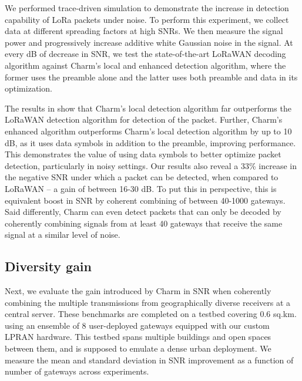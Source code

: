 We performed trace-driven simulation to demonstrate the increase in detection
capability of LoRa packets under noise. To perform this experiment, we collect
data at different spreading factors at high SNRs. We then measure the signal
power and progressively increase additive white Gaussian noise in the signal.
At every dB of decrease in SNR, we test the state-of-the-art LoRaWAN decoding
algorithm against Charm's local and enhanced detection algorithm, where the
former uses the preamble alone and the latter uses both preamble and data in
its optimization.

The results in  show that Charm's local detection
algorithm far outperforms the LoRaWAN detection algorithm for detection of the
packet. Further, Charm's enhanced algorithm outperforms Charm's local
detection algorithm by up to 10 dB, as it uses data symbols in addition to the
preamble, improving performance. This demonstrates the value of using data
symbols to better optimize packet detection, particularly in noisy settings.
Our results also reveal a 33\% increase in the negative SNR under which a
packet can be detected, when compared to LoRaWAN -- a gain of between 16-30
dB. To put this in perspective, this is equivalent boost in SNR by coherent
combining of between 40-1000 gateways. Said differently, Charm can even detect
packets that can only be decoded by coherently combining signals from at least
40 gateways that receive the same signal at a similar level of noise.

\subsection{Diversity gain}
\label{sec:diversity-gain-eval}

Next, we evaluate the  gain introduced by Charm in SNR when coherently
combining the multiple transmissions from geographically diverse receivers at
a central server. These benchmarks are completed on a testbed covering 0.6
sq.km. using an ensemble of 8 user-deployed gateways equipped with our custom
LPRAN hardware. This testbed spans multiple buildings and open spaces between
them, and is supposed to emulate a dense urban deployment. We measure the mean
and standard deviation in SNR improvement as a function of number of gateways
across experiments.

